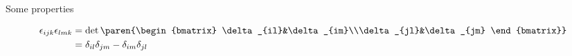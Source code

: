 
Some properties 

\begin{align}
	\epsilon_{ijk}\epsilon_{lmk} &= \det\paren{\begin{bmatrix}
\delta_{il}&\delta_{im}\\\delta_{jl}&\delta_{jm}
\end{bmatrix}} \\
	&= \delta_{il}\delta_{jm} - \delta_{im}\delta_{jl}
\end{align}
